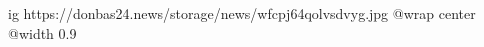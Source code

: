  
 
 
 
 

\ifcmt
  ig https://donbas24.news/storage/news/wfcpj64qolvsdvyg.jpg
  @wrap center
  @width 0.9
\fi
